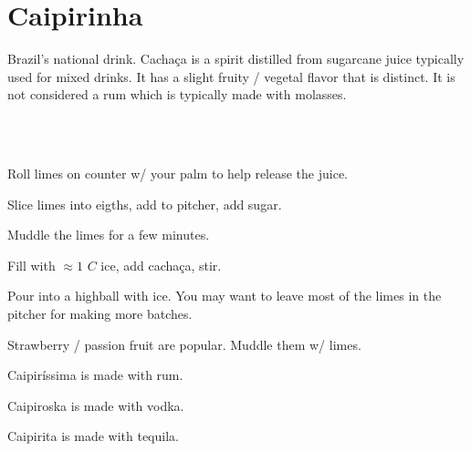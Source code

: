 \section[Caipirinha]{Caipirinha}


\begin{recipestats}[
	servings=2,
	preptime=5 \minute,
	source=Marina \& Kevin,
]
\end{recipestats}


\begin{recipeabstract}
	Brazil's national drink.
	Cacha\c{c}a is a spirit distilled from sugarcane juice typically used for mixed drinks.
	It has a slight fruity / vegetal flavor that is distinct.
	It is not considered a rum which is typically made with molasses.
\end{recipeabstract}


\begin{ingredientcolumns}[1]
	\begin{ingredientblock}
		\\
		\\
	\end{ingredientblock}
\end{ingredientcolumns}


\begin{preparation}
\item Roll limes on counter w/ your palm to help release the juice.
\item Slice limes into eigths, add to pitcher, add sugar.
\item Muddle the limes for a few minutes.
\item Fill with $\approx 1$ $C$ ice, add cacha\c{c}a, stir.
\item Pour into a highball with ice.
	You may want to leave most of the limes in the pitcher for making more batches.
\end{preparation}


\begin{variation}
\item Strawberry / passion fruit are popular.
	Muddle them w/ limes.
\item Caipir\'issima is made with rum.
\item Caipiroska is made with vodka.
\item Caipirita is made with tequila.
\end{variation}


\recipeend%
